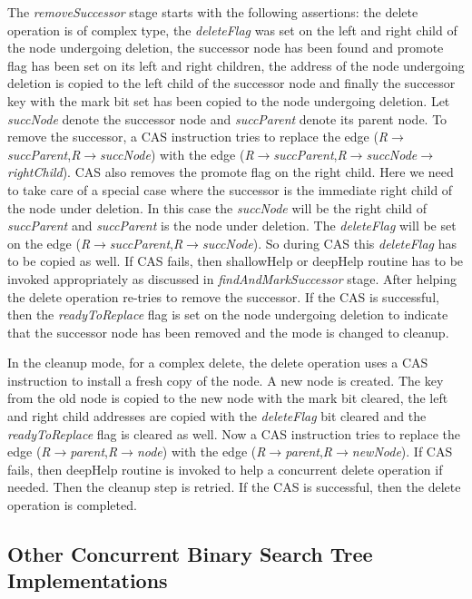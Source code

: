 \documentclass[11pt]{article}
\begin{document}
\begin{multicols}{2}
The \textit{removeSuccessor} stage starts with the following assertions: the delete operation is of complex type, the \textit{deleteFlag} was set on the left and right child of the node undergoing deletion, the successor node has been found and promote flag has been set on its left and right children, the address of the node undergoing deletion is copied to the left child of the successor node and finally the successor key with the mark bit set has been copied to the node undergoing deletion. Let \textit{succNode} denote the successor node and \textit{succParent} denote its parent node. To remove the successor, a CAS instruction tries to replace the edge (\textit{R$\rightarrow$succParent},\textit{R$\rightarrow$succNode}) with the edge (\textit{R$\rightarrow$succParent},\textit{R$\rightarrow$succNode$\rightarrow$rightChild}). CAS also removes the promote flag on the right child. Here we need to take care of a special case where the successor is the immediate right child of the node under deletion. In this case the \textit{succNode} will be the right child of \textit{succParent} and \textit{succParent} is the node under deletion. The \textit{deleteFlag} will be set on the edge (\textit{R$\rightarrow$succParent},\textit{R$\rightarrow$succNode}). So during CAS this \textit{deleteFlag} has to be copied as well. If CAS fails, then shallowHelp or deepHelp routine has to be invoked appropriately as discussed in \textit{findAndMarkSuccessor} stage. After helping the delete operation re-tries to remove the successor. If the CAS is successful, then the \textit{readyToReplace} flag is set on the node undergoing deletion to indicate that the successor node has been removed and the mode is changed to cleanup.

In the cleanup mode, for a complex delete, the delete operation uses a CAS instruction to install a fresh copy of the node. A new node is created. The key from the old node is copied to the new node with the mark bit cleared, the left and right child addresses are copied with the \textit{deleteFlag} bit cleared and the \textit{readyToReplace} flag is cleared as well. Now a CAS instruction tries to replace the edge (\textit{R$\rightarrow$parent},\textit{R$\rightarrow$node}) with the edge (\textit{R$\rightarrow$parent},\textit{R$\rightarrow$newNode}). If CAS fails, then deepHelp routine is invoked to help a concurrent delete operation if needed. Then the cleanup step is retried. If the CAS is successful, then the delete operation is completed.


\subsection{Other Concurrent Binary Search Tree Implementations}

\end{multicols}
\end{document}
